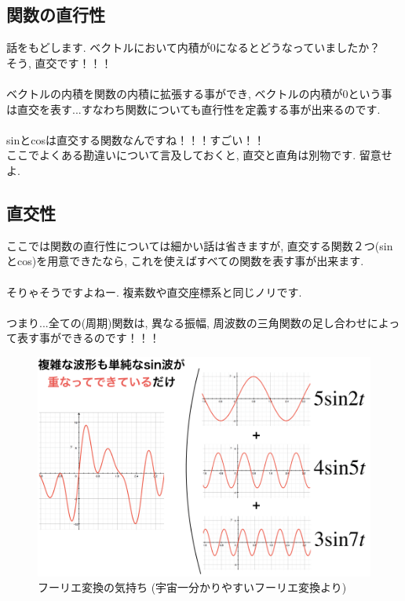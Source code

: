 \documentclass[11pt,a4paper]{jreport}
\begin{document}
\subsection{関数の直行性}
話をもどします. ベクトルにおいて内積が0になるとどうなっていましたか？\\
そう, 直交です！！！\\
\\
ベクトルの内積を関数の内積に拡張する事ができ, ベクトルの内積が0という事は直交を表す...すなわち関数についても直行性を定義する事が出来るのです.\\
\\
sinとcosは直交する関数なんですね！！！すごい！！\\
ここでよくある勘違いについて言及しておくと, 直交と直角は別物です. 留意せよ.
\subsection{直交性}
ここでは関数の直行性については細かい話は省きますが, 直交する関数２つ(sinとcos)を用意できたなら, これを使えばすべての関数を表す事が出来ます.\\
\\
そりゃそうですよねー. 複素数や直交座標系と同じノリです.\\
\\
つまり...全ての(周期)関数は, 異なる振幅, 周波数の三角関数の足し合わせによって表す事ができるのです！！！\\

\begin{figure}[H]
\label{im:furier}
  \centering
  \includegraphics[width=120mm,bb=0 0 974 643]{figures/furier.png}
  \caption{フーリエ変換の気持ち (宇宙一分かりやすいフーリエ変換より)}
\end{figure}
\end{document}
